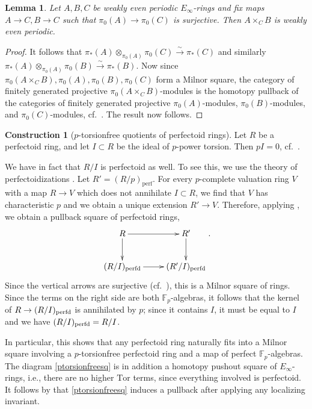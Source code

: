 \documentclass{amsart}
\newtheorem{lemma}[theorem]{Lemma}
\theoremstyle{definition}
\newtheorem{construction}[theorem]{Construction}
\begin{document}
\begin{lemma}  \label{pullbackeven}
Let $A, B, C$ be weakly even periodic $E_\infty$-rings and fix maps $A\to C, B
\to C$ such that $\pi_0(A) \to \pi_0(C)$ is surjective. Then $A \times_C B$ is
weakly even periodic. 
\end{lemma} 
\begin{proof} 
It follows that $ \pi_*(A) \otimes_{\pi_0(A)} \pi_0(C) \xrightarrow{\sim}
\pi_*(C)$ and similarly 
$ \pi_*(A) \otimes_{\pi_0(A)} \pi_0(B) \xrightarrow{\sim}
\pi_*(B)$. 
Now 
since $\pi_0(A \times_C B), \pi_0(A), \pi_0(B), \pi_0(C)$ form a Milnor square, 
the category of finitely generated 
projective 
$\pi_0(A \times_C B)$-modules is the homotopy pullback of the categories of
finitely generated projective $\pi_0(A)$-modules, $\pi_0(B)$-modules, and
$\pi_0(C)$-modules, cf.~\cite[Sec.~2]{Mi71}. 
The result now follows. 
\end{proof} 


\begin{construction}[$p$-torsionfree quotients of perfectoid rings] 
Let $R$ be a perfectoid ring, and let $I \subset R$ be the ideal of $p$-power torsion. 
Then $p I = 0$, cf.~\cite[Prop.~4.19]{BMS2}. 





We have in fact that $R/I$ is perfectoid as well. 
To see this, we use the theory of perfectoidizations 
\cite[Sec.~7--8]{Prisms}. 
Let $R' = (R/p)_{\mathrm{perf}}$. 
For every $p$-complete valuation ring $V$ with a map $R \to V$ which does not
annihilate $I \subset R$, we find that $V$ has characteristic $p$ and we obtain
a unique extension $R' \to V$. 
Therefore, applying 
\cite[Cor.~8.11]{Prisms}, we obtain a pullback square of perfectoid rings,
\begin{equation} \label{ptorsionfreesq} \xymatrix{ 
R \ar[d]  \ar[r] &  R' \ar[d]  \\
(R/I)_{\pf}   \ar[r] & (R'/I)_{\pf}
}. \end{equation}
Since the vertical arrows are surjective (cf.~\cite[Th.~7.4]{Prisms}), this is a Milnor square of rings. 
Since the terms on the right side are both $\mathbb{F}_p$-algebras, it follows
that the kernel of $R \to (R/I)_{\mathrm{perfd}}$ is annihilated by $p$; since it contains
$I$, it must be equal to $I$ and we have $(R/I)_{\mathrm{perfd}} = R/I$. 

In particular, this shows that any perfectoid ring naturally fits into a
Milnor square 
involving a $p$-torsionfree perfectoid ring and a map of perfect $\mathbb{F}_p$-algebras. 
The diagram \eqref{ptorsionfreesq} is in addition a 
homotopy pushout square of $E_\infty$-rings, i.e., there are no higher
$\mathrm{Tor}$ terms, since everything involved is
perfectoid. It follows by \cite{LT19} that \eqref{ptorsionfreesq} induces a
pullback after applying any localizing invariant.  
\end{construction} 
 
\end{document}
